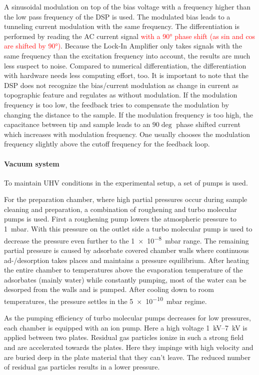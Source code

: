 A sinusoidal modulation on top of the bias voltage with a frequency higher than the low pass frequency of the DSP is used. The modulated bias leads to a tunneling current modulation with the same frequency. The differentiation is performed by reading the AC current signal \textcolor{red}{with a 90° phase shift (as sin and cos are shifted by 90°)}. Because the Lock-In Amplifier only takes signals with the same frequency than the excitation frequency into account, the results are much less suspect to noise. Compared to numerical differentiation, the differentiation with hardware needs less computing effort, too. It is important to note that the DSP does not recognize the bias/current modulation as change in current as topographic feature and regulates as without modulation. If the modulation frequency is too low, the feedback tries to compensate the modulation by changing the distance to the sample. If the modulation frequency is too high, the capacitance between tip and sample leads to an $90\deg$ phase shifted current which increases with modulation frequency. One usually chooses the modulation frequency slightly above the cutoff frequency for the feedback loop.

\paragraph{Vacuum system}
To maintain UHV conditions in the experimental setup, a set of pumps is used.

For the preparation chamber, where high partial pressures occur during sample cleaning and preparation, a combination of roughening and turbo molecular pumps is used. First a roughening pump lowers the atmospheric pressure to \SI{1}{\milli \bar}. With this pressure on the outlet side a turbo molecular pump is used to decrease the pressure even further to the  \SI{1e-8}{\milli \bar} range. The remaining partial pressure is caused by adsorbate covered chamber walls where continuous ad-/desorption takes places and maintains a pressure equilibrium. After heating the entire chamber to temperatures above the evaporation temperature of the adsorbates (mainly water) while constantly pumping, most of the water can be desorped from the walls and is pumped. After cooling down to room temperatures, the pressure settles in the \SI{5e-10}{\milli \bar} regime.

As the pumping efficiency of turbo molecular pumps decreases for low pressures, each chamber is equipped with an ion pump. Here a high voltage \SIrange{1}{7}{\kilo \volt} is applied between two plates. Residual gas particles ionize in such a strong field and are accelerated towards the plates. Here they impinge with high velocity and are buried deep in the plate material that they can't leave. The reduced number of residual gas particles results in a lower pressure.

